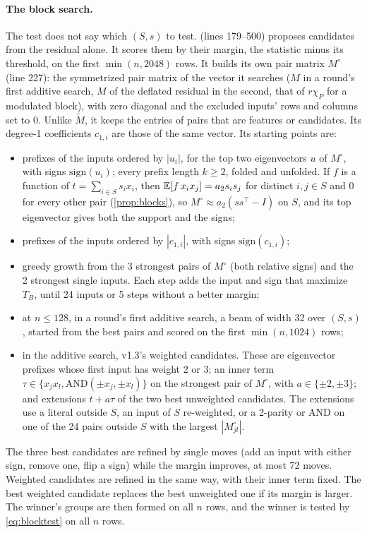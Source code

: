 \paragraph{The block search.} The test does not say which $(S,s)$ to test.  (lines 179--500) proposes candidates from the residual alone. It scores them by their margin, the statistic minus its threshold, on the first $\min(n,2048)$ rows. It builds its own pair matrix $M^\circ$ (line 227): the symmetrized pair matrix of the vector it searches ($M$ in a round's first additive search, $M$ of the deflated residual in the second, that of $r\chi_P$ for a modulated block), with zero diagonal and the excluded inputs' rows and columns set to 0. Unlike $\tilde M$, it keeps the entries of pairs that are features or candidates. Its degree-1 coefficients $c_{1,i}$ are those of the same vector. Its starting points are:
\begin{itemize}
\item prefixes of the inputs ordered by $|u_i|$, for the top two eigenvectors $u$ of $M^\circ$, with signs $\mathrm{sign}(u_i)$; every prefix length $k\ge2$, folded and unfolded. If $f$ is a function of $t=\sum_{i\in S}s_ix_i$, then $\mathbb{E}[f\,x_ix_j]=a_2s_is_j$ for distinct $i,j\in S$ and 0 for every other pair (\cref{prop:blocks}), so $M^\circ\approx a_2(ss^\top-I)$ on $S$, and its top eigenvector gives both the support and the signs;
\item prefixes of the inputs ordered by $|c_{1,i}|$, with signs $\mathrm{sign}(c_{1,i})$;
\item greedy growth from the 3 strongest pairs of $M^\circ$ (both relative signs) and the 2 strongest single inputs. Each step adds the input and sign that maximize $T_B$, until 24 inputs or 5 steps without a better margin;
\item at $n\le128$, in a round's first additive search, a beam of width 32 over $(S,s)$, started from the best pairs and scored on the first $\min(n,1024)$ rows;
\item in the additive search, v1.3's weighted candidates. These are eigenvector prefixes whose first input has weight 2 or 3; an inner term $\tau\in\{x_jx_l,\mathrm{AND}(\pm x_j,\pm x_l)\}$ on the strongest pair of $M^\circ$, with $a\in\{\pm2,\pm3\}$; and extensions $t+a\tau$ of the two best unweighted candidates. The extensions use a literal outside $S$, an input of $S$ re-weighted, or a 2-parity or AND on one of the 24 pairs outside $S$ with the largest $|M^\circ_{jl}|$.
\end{itemize}
The three best candidates are refined by single moves (add an input with either sign, remove one, flip a sign) while the margin improves, at most 72 moves. Weighted candidates are refined in the same way, with their inner term fixed. The best weighted candidate replaces the best unweighted one if its margin is larger. The winner's groups are then formed on all $n$ rows, and the winner is tested by \cref{eq:blocktest} on all $n$ rows.

